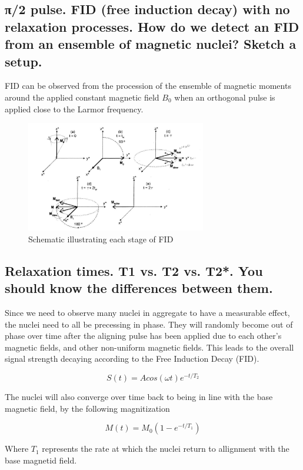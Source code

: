 \documentclass[12pt]{article}
\begin{document}
\subsection { π/2 pulse. FID (free induction decay) with no relaxation processes. How do we detect an FID from an ensemble of magnetic nuclei? Sketch a setup.}

FID can be observed from the procession of the ensemble of magnetic moments around the applied constant magnetic field $B_0$ when an orthogonal pulse is applied close to the Larmor frequency.

\begin{figure}[h!]
  \centering
  \includegraphics[width=0.7\textwidth]{FID.png}
  \caption{Schematic illustrating each stage of FID \cite{pulsed_spectrometer_manual}}
  \label{fig:example}
\end{figure}



\subsection {Relaxation times. T1 vs. T2 vs. T2*. You should know the differences between them.}

Since we need to observe many nuclei in aggregate to have a measurable effect, the nuclei need to all be precessing in phase. They will randomly become out of phase over time after the aligning pulse has been applied due to each other's magnetic fields, and other non-uniform magnetic fields. This leads to the overall signal strength decaying according to the Free Induction Decay (FID).

\[S(t) = Acos(\omega t)e^{-t/T_2}\]

The nuclei will also converge over time back to being in line with the base magnetic field, by the following magnitization

\[M(t) = M_0(1-e^{-t/T_1})\]

Where $T_1$ represents the rate at which the nuclei return to allignment with the base magnetid field.
\end{document}

